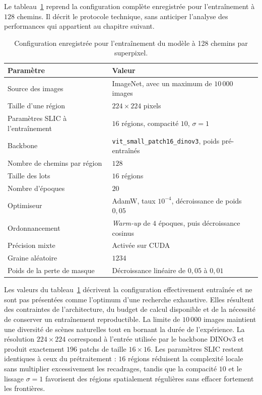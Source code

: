 \documentclass[12pt, a4paper, oneside]{report}
\begin{document}
Le tableau~\ref{tab:configuration_entrainement} reprend la configuration complète enregistrée pour l'entraînement à $128$ chemins. Il décrit le protocole technique, sans anticiper l'analyse des performances qui appartient au chapitre suivant.

\begin{table}[H]
    \centering
    \small
    \caption{Configuration enregistrée pour l'entraînement du modèle à 128 chemins par superpixel.}
    \label{tab:configuration_entrainement}
    \begin{tabular}{p{5.1cm}p{7.4cm}}
        \toprule
        \textbf{Paramètre} & \textbf{Valeur} \\
        \midrule
        Source des images & ImageNet, avec un maximum de $10\,000$ images \\
        Taille d'une région & $224 \times 224$ pixels \\
        Paramètres SLIC à l'entraînement & $16$ régions, compacité $10$, $\sigma=1$ \\
        Backbone & \texttt{vit\_small\_patch16\_dinov3}, poids pré-entraînés \\
        Nombre de chemins par région & $128$ \\
        Taille des lots & $16$ régions \\
        Nombre d'époques & $20$ \\
        Optimiseur & AdamW, taux $10^{-4}$, décroissance de poids $0{,}05$ \\
        Ordonnancement & \textit{Warm-up} de $4$ époques, puis décroissance cosinus \\
        Précision mixte & Activée sur CUDA \\
        Graine aléatoire & $1234$ \\
        Poids de la perte de masque & Décroissance linéaire de $0{,}05$ à $0{,}01$ \\
        \bottomrule
    \end{tabular}
\end{table}

Les valeurs du tableau~\ref{tab:configuration_entrainement} décrivent la configuration effectivement entraînée et ne sont pas présentées comme l'optimum d'une recherche exhaustive. Elles résultent des contraintes de l'architecture, du budget de calcul disponible et de la nécessité de conserver un entraînement reproductible. La limite de $10\,000$ images maintient une diversité de scènes naturelles tout en bornant la durée de l'expérience. La résolution $224 \times 224$ correspond à l'entrée utilisée par le backbone DINOv3 et produit exactement $196$ patchs de taille $16 \times 16$. Les paramètres SLIC restent identiques à ceux du prétraitement : $16$ régions réduisent la complexité locale sans multiplier excessivement les recadrages, tandis que la compacité $10$ et le lissage $\sigma=1$ favorisent des régions spatialement régulières sans effacer fortement les frontières.
\end{document}
